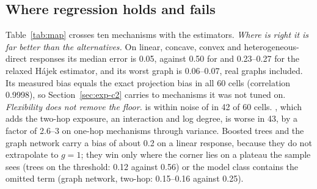 \subsection{Where regression holds and fails}\label{sec:exp-c5}
\begin{table}[tb]
\caption{RMSE$/(|\beta|+|\gamma|)$ by mechanism and estimator, median / worst over six graphs (ER, SBM, BA, WS at $n=2000$, $d=20$; ego-Facebook thinned to $n=4039$; Stanford3 thinned to $n=11586$), $p=\tfrac12$, $\sigma=0.5$, 100 replicates;  is $0.50$ by construction. Hájek$_{.25}$ is the relaxed Hájek estimator with $\delta=0.25$. Intervals are in Tables~\ref{tab:cmedian} and~\ref{tab:cworst}. Bold: the lowest non-oracle median and any entry whose interval overlaps it; grey: the oracle , which knows the response form and bounds what any regression can do. $^\dagger$ was not run on Stanford3 (median and worst over five graphs). The exact  has RMSE of $10^{33}$ or more here and is omitted.}
\label{tab:map}
\centering

\end{table}
Table~\ref{tab:map} crosses ten mechanisms with the estimators.
\emph{Where  is right it is far better than the alternatives.} On linear, concave, convex and heterogeneous-direct responses its median error is 0.05, against 0.50 for  and 0.23--0.27 for the relaxed Hájek estimator, and its worst graph is 0.06--0.07, real graphs included. Its measured bias equals the exact projection bias in all 60 cells (correlation 0.9998), so Section~\ref{sec:exp-c2} carries to mechanisms it was not tuned on.
\emph{Flexibility does not remove the floor.}  is within noise of  in 42 of 60 cells. , which adds the two-hop exposure, an interaction and log degree, is worse in 43, by a factor of 2.6--3 on one-hop mechanisms through variance. Boosted trees and the graph network carry a bias of about 0.2 on a linear response, because they do not extrapolate to $g=1$; they win only where the corner lies on a plateau the sample sees (trees on the threshold: 0.12 against 0.56) or the model class contains the omitted term (graph network, two-hop: 0.15--0.16 against 0.25).
